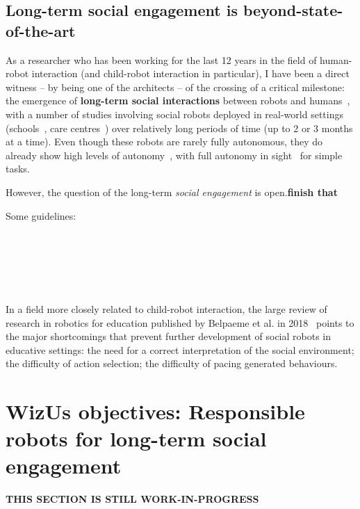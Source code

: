 \documentclass[11pt,a4paper]{report}
\newcommand{\project}{WizUs\xspace}
\newcommand{\TODO}[1]{{\color{red}\textbf{#1}}}
\begin{document}
\subsection{Long-term social engagement is beyond-state-of-the-art}

As a researcher who has been working for the last 12 years in the field of
human-robot interaction (and child-robot interaction in particular), I have been
a direct witness -- by being one of the architects -- of the crossing of a
critical milestone: the emergence of \textbf{long-term social interactions}
between robots and humans~\cite{kunze2018artificial,leite2013social}, with a
number of studies involving social robots deployed in
real-world settings (schools~\cite{westlund2017measuring, lemaignan2016learning}, care
centres~\cite{hawes2017strands}) over relatively long periods of time (up to 2
or 3 months at a time). Even though these robots are rarely fully autonomous,
they do already show high levels of autonomy~\cite{senft2019teaching}, with full
autonomy in sight~\cite{hawes2017strands} for simple tasks.

However, the question of the long-term \emph{social engagement} is
open.\TODO{finish that}



Some guidelines:

~\cite{tulli2019great}
~\cite{hoffman2019anki}

~\cite{tonkin2018design}


~\cite{baraka2019extended}

In a field more closely related to child-robot interaction, the large review of
research in robotics for education published by Belpaeme et al. in
2018~\cite{belpaeme2018social} points to the major shortcomings that prevent
further development of social robots in educative settings: the need for a correct
interpretation of the social environment; the difficulty of action selection;
the difficulty of pacing generated behaviours.









\section{\project objectives: Responsible robots for long-term social engagement}
\TODO{THIS SECTION IS STILL WORK-IN-PROGRESS}
\end{document}
